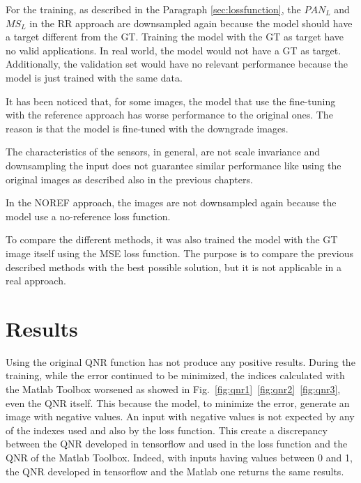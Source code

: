 \documentclass[12pt]{report}
\begin{document}
For the training, as described in the Paragraph \ref{sec:lossfunction}, the $PAN_L$ and $MS_L$ in the RR approach are downsampled again because the model
should have a target different from the GT.
Training the model with the GT as target have no valid applications.
In real world, the model would not have a GT as target.
Additionally, the validation set would have no relevant performance because the model is just trained with the same data.

It has been noticed that, for some images, the model that use the fine-tuning with the reference approach has worse performance to the original ones.
The reason is that the model is fine-tuned with the downgrade images.

The characteristics of the sensors, in general, are not scale invariance and downsampling the input does not guarantee similar performance like using the original images
as described also in the previous chapters.

In the NOREF approach, the images are not downsampled again because the model use a no-reference loss function.

To compare the different methods, it was also trained the model with the GT image itself using the MSE loss function.
The purpose is to compare the previous described methods with the best possible solution, but it is not applicable in a real approach.

\section{Results}
Using the original QNR function has not produce any positive results.
During the training, while the error continued to be minimized, the indices calculated with the Matlab Toolbox worsened as showed in Fig.~\ref{fig:qnr1}~\ref{fig:qnr2}~\ref{fig:qnr3}, even the QNR itself.
This because the model, to minimize the error, generate an image with negative values.
An input with negative values is not expected by any of the indexes used and also by the loss function.
This create a discrepancy between the QNR developed in tensorflow and used in the loss function and the QNR of the Matlab Toolbox.
Indeed, with inputs having values between 0 and 1, the QNR developed in tensorflow and the Matlab one returns the same results.
\end{document}
